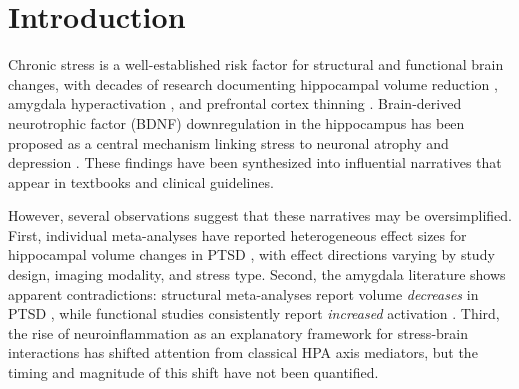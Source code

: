 \documentclass[12pt,a4paper]{article}
\begin{document}
\begin{abstract}
\textbf{Conclusions.} This large-scale scoping review, based on LLM-powered extraction from 9,585 abstracts, reveals that established stress--brain narratives are quantitatively more complex than textbook summaries suggest. The ``BDNF always decreases'' and ``amygdala always increases'' simplicities do not survive metric-separated, temporally resolved analysis of reporting patterns. These patterns provide an evidence-based roadmap for future research priorities and demonstrate the utility of LLM-based extraction as a complement to traditional systematic reviews. We emphasize that these are literature reporting patterns, not pooled effect sizes; full-text quantitative meta-analysis is in progress. The complete list of all 9,585 included studies (PMID, title, journal, year, PMC ID) is provided as Supplementary Table~S1, enabling full retrieval of the source literature from PubMed/PMC under each article's respective license.

\medskip
\noindent\textbf{Keywords:} chronic stress, brain structure, BDNF, neuroinflammation, HPA axis, hippocampus, amygdala, LLM, NLP, scoping review, reporting patterns
\end{abstract}

\section{Introduction}

Chronic stress is a well-established risk factor for structural and functional brain changes, with decades of research documenting hippocampal volume reduction \citep{mcewen1999,lupien2009}, amygdala hyperactivation \citep{vyas2002}, and prefrontal cortex thinning \citep{arnsten2009}. Brain-derived neurotrophic factor (BDNF) downregulation in the hippocampus has been proposed as a central mechanism linking stress to neuronal atrophy and depression \citep{duman2006}. These findings have been synthesized into influential narratives that appear in textbooks and clinical guidelines.

However, several observations suggest that these narratives may be oversimplified. First, individual meta-analyses have reported heterogeneous effect sizes for hippocampal volume changes in PTSD \citep{odoherty2015}, with effect directions varying by study design, imaging modality, and stress type. Second, the amygdala literature shows apparent contradictions: structural meta-analyses report volume \textit{decreases} in PTSD \citep{odoherty2015}, while functional studies consistently report \textit{increased} activation \citep{shin2006}. Third, the rise of neuroinflammation as an explanatory framework for stress-brain interactions \citep{miller2016,wohleb2016} has shifted attention from classical HPA axis mediators, but the timing and magnitude of this shift have not been quantified.
\end{document}
